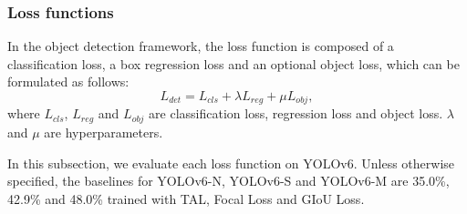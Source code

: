 \documentclass[10pt,twocolumn,letterpaper]{article}
\begin{document}
\subsubsection{Loss functions}
\label{sec:exp:ablate:loss}
In the object detection framework, the loss function is composed of a classification loss, a box regression loss and an optional object loss, which can be formulated as follows:
\begin{equation}
L_{det} = L_{cls} + \lambda L_{reg} + \mu L_{obj},
\end{equation}
where $L_{cls}$, $L_{reg}$ and $L_{obj}$ are classification loss, regression loss and object loss. $\lambda$ and $\mu$ are hyperparameters. 

In this subsection, we evaluate each loss function on YOLOv6. Unless otherwise specified, the baselines for YOLOv6-N, YOLOv6-S and YOLOv6-M are 35.0\%, 42.9\% and 48.0\% trained with TAL, Focal Loss and GIoU Loss.


\begin{table}
  \centering
\caption{Ablation study on classification loss functions.}
\label{tab:ablate:clsloss}
\end{table}
\end{document}
